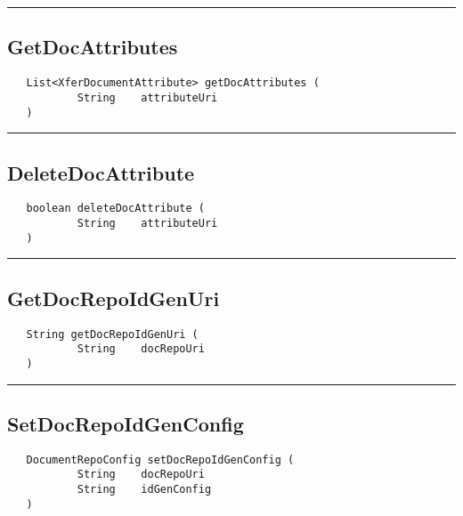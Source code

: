 \rule{15cm}{2pt}
\subsection{GetDocAttributes}
\label{Api:GetDocAttributes}
\begin{verbatim}
   List<XferDocumentAttribute> getDocAttributes (
           String    attributeUri
   )
\end{verbatim}



\rule{15cm}{2pt}
\subsection{DeleteDocAttribute}
\label{Api:DeleteDocAttribute}
\begin{verbatim}
   boolean deleteDocAttribute (
           String    attributeUri
   )
\end{verbatim}



\rule{15cm}{2pt}
\subsection{GetDocRepoIdGenUri}
\label{Api:GetDocRepoIdGenUri}
\begin{verbatim}
   String getDocRepoIdGenUri (
           String    docRepoUri
   )
\end{verbatim}



\rule{15cm}{2pt}
\subsection{SetDocRepoIdGenConfig}
\label{Api:SetDocRepoIdGenConfig}
\begin{verbatim}
   DocumentRepoConfig setDocRepoIdGenConfig (
           String    docRepoUri
           String    idGenConfig
   )
\end{verbatim}



